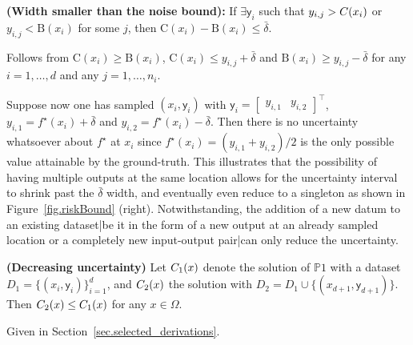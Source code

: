 \begin{proposition} 
	\label{prop.smallWidth}
	{\normalfont \textbf{(Width smaller than the noise bound):}}
	If $\exists \mathsf{y}_i$ such that $y_{i,j} > {\normalfont C}(x_i)$ or $y_{i,j} < \text{B}(x_i)$ for some $j$, then $\text{C}(x_i) - \text{B}(x_i) \leq \bar \delta$.
\end{proposition}
\begin{my_proof}
	Follows from $\text{C}(x_i) \geq \text{B}(x_i)$, $\text{C}(x_i) \leq y_{i,j} + \bar \delta$ and $\text{B}(x_i) \geq y_{i,j} - \bar \delta$ for any $i=1,\dots,d$ and any $j=1,\dots,n_i$. 
\end{my_proof} 

Suppose now one has sampled $(x_i,\mathsf{y}_i)$ with $\mathsf{y}_i = \begin{bmatrix} y_{i,1} & y_{i,2} \end{bmatrix}^\top$, $y_{i,1} = f^\star(x_i) + \bar \delta$ and $y_{i,2} = f^\star(x_i) - \bar \delta$. Then there is no uncertainty whatsoever about $f^\star$ at $x_i$ since $f^\star(x_i) = (y_{i,1} + y_{i,2})/2$ is the only possible value attainable by the ground-truth. This illustrates that the possibility of having multiple outputs at the same location allows for the uncertainty interval to shrink past the $\bar \delta$ width, and eventually even reduce to a singleton as shown in Figure~\ref{fig.riskBound} (right). Notwithstanding, the addition of a new datum to an existing dataset|be it in the form of a new output at an already sampled location or a completely new input-output pair|can only reduce the uncertainty.

\begin{proposition} 
	\label{prop.decreasing}
	{\normalfont \textbf{(Decreasing uncertainty)}}
	Let $C_{{\normalfont 1}}(x)$ denote the solution of $\mathds{P}1$ with a dataset $D_1 = \{(x_i,\mathsf{y}_i)\}_{i=1}^{d}$, and $C_{{\normalfont 2}}(x)$ the solution with $D_2 = D_1 \cup \{(x_{d+1},\mathsf{y}_{d+1})\}$. Then $C_{{\normalfont 2}}(x) \leq C_{{\normalfont 1}}(x)$ for any $x \in \Omega$. 
\end{proposition}
\begin{my_proof}
	Given in Section~\ref{sec.selected_derivations}.
\end{my_proof}

